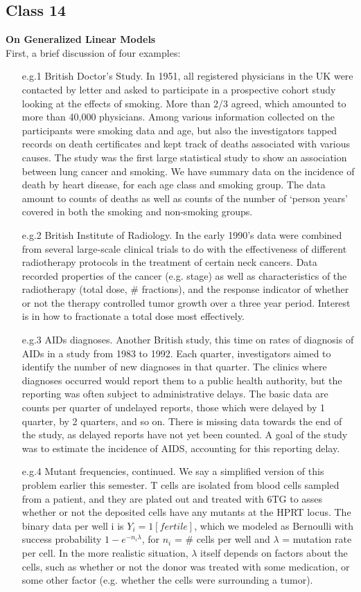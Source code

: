 \documentclass[11pt,a4paper]{article}
\begin{document}
\subsection*{Class 14}
\textbf{On Generalized Linear Models}\\
First, a brief discussion of four examples:
\begin{enumerate}
\item[e.g.1] British Doctor's Study.  In 1951, all registered physicians in the UK were contacted by letter and asked to participate in a prospective cohort study looking at the effects of smoking.  More than 2/3 agreed, which amounted to more than 40,000 physicians.  Among various information collected on the participants were smoking data and age, but also the investigators tapped records on death certificates and kept track of deaths associated with various causes. The study was the first large statistical study to show an association between lung cancer and smoking.  We have summary data on the incidence of death by heart disease, for each age class and smoking group.  The data amount to counts of deaths as well as counts of the number of `person years' covered in both the smoking and non-smoking groups.
\item[e.g.2] British Institute of Radiology.  In the early 1990's data were combined from several large-scale clinical trials to do with the effectiveness of different radiotherapy protocols in the treatment of certain neck cancers.   Data recorded properties of the cancer (e.g. stage) as well as characteristics of the radiotherapy (total dose, \# fractions), and the response indicator of whether or not the therapy controlled tumor growth over a three year period.  Interest is in how to fractionate a total dose most effectively.
\item[e.g.3] AIDs diagnoses.  Another British study, this time on rates of diagnosis of AIDs in a study from 1983 to 1992.  Each quarter, investigators aimed to identify the number of new diagnoses in that quarter.  The clinics where diagnoses occurred would report them to a public health authority, but the reporting was often subject to administrative delays. The basic data are counts per quarter of undelayed reports, those which were delayed by 1 quarter, by 2  quarters, and so on.  There is missing data towards the end of the study, as delayed reports have not yet been counted.  A goal of the study was to estimate the incidence of AIDS, accounting for this reporting delay.
\item[e.g.4] Mutant frequencies, continued. We say a simplified version of this problem earlier this semester.  T cells are isolated from blood cells sampled from a patient, and they are plated out and treated with 6TG to asses whether or not the deposited cells have any mutants at the HPRT locus.   The binary data per well i is $Y_i = 1[ fertile ]$, which we modeled as Bernoulli with success probability $1 - e^{-n_i \lambda}$, for $n_i$ = \# cells per well and $\lambda$ = mutation rate per cell.  In the more realistic situation, $\lambda$ itself depends on factors about the cells, such as whether or not the donor was treated with some medication, or some other factor (e.g. whether the cells were surrounding a tumor).
\end{enumerate}
\end{document}
